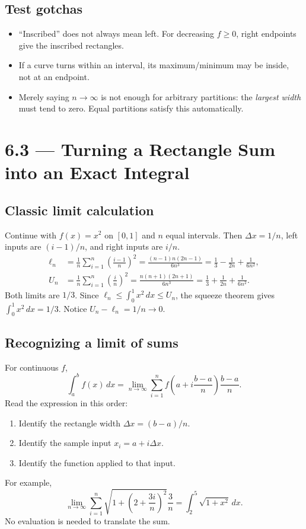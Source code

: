 \documentclass[11pt]{article}
\newcommand{\topic}[2]{\clearpage\section*{#1 --- #2}}
\newcommand{\dx}{\,dx}
\begin{document}
\subsection*{Test gotchas}
\begin{itemize}
\item ``Inscribed'' does not always mean left. For decreasing $f\ge0$, right endpoints give the inscribed rectangles.
\item If a curve turns within an interval, its maximum/minimum may be inside, not at an endpoint.
\item Merely saying $n\to\infty$ is not enough for arbitrary partitions: the \emph{largest width} must tend to zero. Equal partitions satisfy this automatically.
\end{itemize}

\topic{6.3}{Turning a Rectangle Sum into an Exact Integral}
\subsection*{Classic limit calculation}
Continue with $f(x)=x^2$ on $[0,1]$ and $n$ equal intervals.
Then $\Delta x=1/n$, left inputs are $(i-1)/n$, and right inputs are $i/n$.
\begin{align*}
\ell_n&=\frac1n\sum_{i=1}^n\left(\frac{i-1}{n}\right)^2
=\frac{(n-1)n(2n-1)}{6n^3}
=\frac13-\frac{1}{2n}+\frac{1}{6n^2},\\
U_n&=\frac1n\sum_{i=1}^n\left(\frac{i}{n}\right)^2
=\frac{n(n+1)(2n+1)}{6n^3}
=\frac13+\frac{1}{2n}+\frac{1}{6n^2}.
\end{align*}
Both limits are $1/3$. Since $\ell_n\le\int_0^1x^2\dx\le U_n$, the squeeze theorem gives $\int_0^1x^2\dx=1/3$. Notice $U_n-\ell_n=1/n\to0$.

\subsection*{Recognizing a limit of sums}
For continuous $f$,
\[
\int_a^b f(x)\dx=
\lim_{n\to\infty}\sum_{i=1}^n
f\left(a+i\frac{b-a}{n}\right)\frac{b-a}{n}.
\]
Read the expression in this order:
\begin{enumerate}
\item Identify the rectangle width $\Delta x=(b-a)/n$.
\item Identify the sample input $x_i=a+i\Delta x$.
\item Identify the function applied to that input.
\end{enumerate}
For example,
\[
\lim_{n\to\infty}\sum_{i=1}^n
\sqrt{1+\left(2+\frac{3i}{n}\right)^2}\frac3n
=\int_2^5\sqrt{1+x^2}\dx.
\]
No evaluation is needed to translate the sum.
\end{document}
